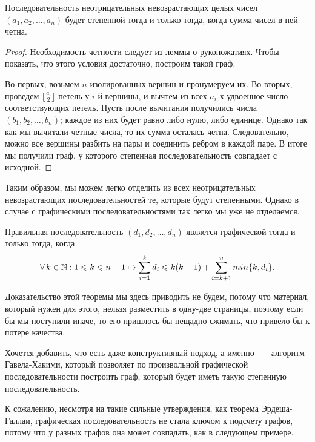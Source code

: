 \begin{statement}
	Последовательность неотрицательных невозрастающих целых чисел $(a_1, a_2, \dots, a_n)$ будет степенной тогда и только тогда, когда сумма чисел в ней четна.
	
\begin{proof}
	Необходимость четности следует из леммы о рукопожатиях. Чтобы показать, что этого условия достаточно, построим такой граф.
	
	Во-первых, возьмем $n$ изолированных вершин и пронумеруем их. Во-вторых, проведем $\lfloor \frac{a_i}{2} \rfloor$ петель у $i$-й вершины, и вычтем из всех $a_i$-х удвоенное число соответствующих петель. Пусть после вычитания получились числа $(b_1, b_2, \dots, b_n)$; каждое из них будет равно либо нулю, либо единице. Однако так как мы вычитали четные числа, то их сумма осталась четна. Следовательно, можно все вершины разбить на пары и соединить ребром в каждой паре. В итоге мы получили граф, у которого степенная последовательность совпадает с исходной.
\end{proof}\end{statement}

	Таким образом, мы можем легко отделить из всех неотрицательных невозрастающих последовательностей те, которые будут степенными. Однако в случае с графическими последовательностями так легко мы уже не отделаемся.

\begin{theorem}
	Правильная последовательность $(d_1, d_2, \dots, d_n)$ является графической тогда и только тогда, когда 
	$$\forall \!\ k \in \mathbb{N}: 1 \leqslant k \leqslant n-1 \mapsto \sum_{i=1}^k d_i \leqslant k(k-1) + \sum_{i=k+1}^n min \lbrace k, d_i \rbrace. $$
\end{theorem}

	Доказательство этой теоремы мы здесь приводить не будем, потому что материал, который нужен для этого, нельзя разместить в одну-две страницы, поэтому если бы мы поступили иначе, то его пришлось бы нещадно сжимать, что привело бы к потере качества.

	Хочется добавить, что есть даже конструктивный подход, а именно~---~алгоритм Гавела-Хакими, который позволяет по произвольной графической последовательности построить граф, который будет иметь такую степенную последовательность.

	К сожалению, несмотря на такие сильные утверждения, как теорема Эрдеша-Галлаи, графическая последовательность не стала ключом к подсчету графов, потому что у разных графов она может совпадать, как в следующем примере.
	
